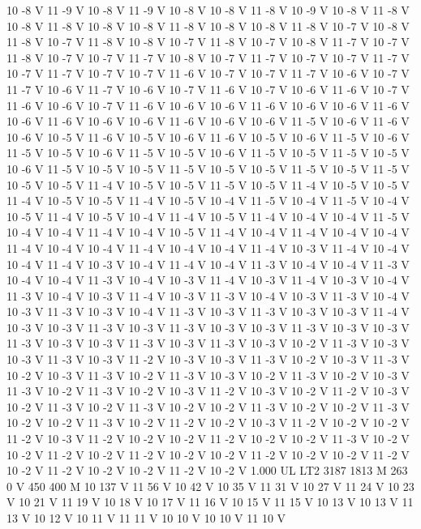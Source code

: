 {10 -8 V
11 -9 V
10 -8 V
11 -9 V
10 -8 V
10 -8 V
11 -8 V
10 -9 V
10 -8 V
11 -8 V
10 -8 V
11 -8 V
10 -8 V
10 -8 V
11 -8 V
10 -8 V
10 -8 V
11 -8 V
10 -7 V
10 -8 V
11 -8 V
10 -7 V
11 -8 V
10 -8 V
10 -7 V
11 -8 V
10 -7 V
10 -8 V
11 -7 V
10 -7 V
11 -8 V
10 -7 V
10 -7 V
11 -7 V
10 -8 V
10 -7 V
11 -7 V
10 -7 V
10 -7 V
11 -7 V
10 -7 V
11 -7 V
10 -7 V
10 -7 V
11 -6 V
10 -7 V
10 -7 V
11 -7 V
10 -6 V
10 -7 V
11 -7 V
10 -6 V
11 -7 V
10 -6 V
10 -7 V
11 -6 V
10 -7 V
10 -6 V
11 -6 V
10 -7 V
11 -6 V
10 -6 V
10 -7 V
11 -6 V
10 -6 V
10 -6 V
11 -6 V
10 -6 V
10 -6 V
11 -6 V
10 -6 V
11 -6 V
10 -6 V
10 -6 V
11 -6 V
10 -6 V
10 -6 V
11 -5 V
10 -6 V
11 -6 V
10 -6 V
10 -5 V
11 -6 V
10 -5 V
10 -6 V
11 -6 V
10 -5 V
10 -6 V
11 -5 V
10 -6 V
11 -5 V
10 -5 V
10 -6 V
11 -5 V
10 -5 V
10 -6 V
11 -5 V
10 -5 V
11 -5 V
10 -5 V
10 -6 V
11 -5 V
10 -5 V
10 -5 V
11 -5 V
10 -5 V
10 -5 V
11 -5 V
10 -5 V
11 -5 V
10 -5 V
10 -5 V
11 -4 V
10 -5 V
10 -5 V
11 -5 V
10 -5 V
11 -4 V
10 -5 V
10 -5 V
11 -4 V
10 -5 V
10 -5 V
11 -4 V
10 -5 V
10 -4 V
11 -5 V
10 -4 V
11 -5 V
10 -4 V
10 -5 V
11 -4 V
10 -5 V
10 -4 V
11 -4 V
10 -5 V
11 -4 V
10 -4 V
10 -4 V
11 -5 V
10 -4 V
10 -4 V
11 -4 V
10 -4 V
10 -5 V
11 -4 V
10 -4 V
11 -4 V
10 -4 V
10 -4 V
11 -4 V
10 -4 V
10 -4 V
11 -4 V
10 -4 V
10 -4 V
11 -4 V
10 -3 V
11 -4 V
10 -4 V
10 -4 V
11 -4 V
10 -3 V
10 -4 V
11 -4 V
10 -4 V
11 -3 V
10 -4 V
10 -4 V
11 -3 V
10 -4 V
10 -4 V
11 -3 V
10 -4 V
10 -3 V
11 -4 V
10 -3 V
11 -4 V
10 -3 V
10 -4 V
11 -3 V
10 -4 V
10 -3 V
11 -4 V
10 -3 V
11 -3 V
10 -4 V
10 -3 V
11 -3 V
10 -4 V
10 -3 V
11 -3 V
10 -3 V
10 -4 V
11 -3 V
10 -3 V
11 -3 V
10 -3 V
10 -3 V
11 -4 V
10 -3 V
10 -3 V
11 -3 V
10 -3 V
11 -3 V
10 -3 V
10 -3 V
11 -3 V
10 -3 V
10 -3 V
11 -3 V
10 -3 V
10 -3 V
11 -3 V
10 -3 V
11 -3 V
10 -3 V
10 -2 V
11 -3 V
10 -3 V
10 -3 V
11 -3 V
10 -3 V
11 -2 V
10 -3 V
10 -3 V
11 -3 V
10 -2 V
10 -3 V
11 -3 V
10 -2 V
10 -3 V
11 -3 V
10 -2 V
11 -3 V
10 -3 V
10 -2 V
11 -3 V
10 -2 V
10 -3 V
11 -3 V
10 -2 V
11 -3 V
10 -2 V
10 -3 V
11 -2 V
10 -3 V
10 -2 V
11 -2 V
10 -3 V
10 -2 V
11 -3 V
10 -2 V
11 -3 V
10 -2 V
10 -2 V
11 -3 V
10 -2 V
10 -2 V
11 -3 V
10 -2 V
10 -2 V
11 -3 V
10 -2 V
11 -2 V
10 -2 V
10 -3 V
11 -2 V
10 -2 V
10 -2 V
11 -2 V
10 -3 V
11 -2 V
10 -2 V
10 -2 V
11 -2 V
10 -2 V
10 -2 V
11 -3 V
10 -2 V
10 -2 V
11 -2 V
10 -2 V
11 -2 V
10 -2 V
10 -2 V
11 -2 V
10 -2 V
10 -2 V
11 -2 V
10 -2 V
11 -2 V
10 -2 V
10 -2 V
11 -2 V
10 -2 V
1.000 UL
LT2
3187 1813 M
263 0 V
450 400 M
10 137 V
11 56 V
10 42 V
10 35 V
11 31 V
10 27 V
11 24 V
10 23 V
10 21 V
11 19 V
10 18 V
10 17 V
11 16 V
10 15 V
11 15 V
10 13 V
10 13 V
11 13 V
10 12 V
10 11 V
11 11 V
10 10 V
10 10 V
11 10 V
}
